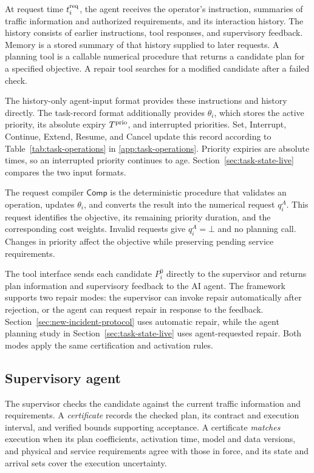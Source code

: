 \documentclass[preprint,12pt]{elsarticle}
\theoremstyle{definition}
\theoremstyle{plain}
\theoremstyle{definition}
\theoremstyle{plain}
\newcommand{\appref}[1]{\ref{#1}}
\begin{document}
At request time $t_i^{\rm req}$, the agent receives the operator's
instruction, summaries of traffic information and authorized requirements,
and its interaction history. The history consists of earlier instructions,
tool responses, and supervisory feedback. Memory is a stored summary of
that history supplied to later requests. A planning tool is a callable
numerical procedure that returns a candidate plan for a specified
objective. A repair tool searches for a modified candidate after a failed
check.

The history-only agent-input format provides these instructions and
history directly. The task-record format additionally provides
$\theta_i$, which stores the active priority, its absolute expiry
$T^{\rm prio}$, and interrupted priorities. Set, Interrupt, Continue,
Extend, Resume, and Cancel update this record according to
Table~\ref{tab:task-operations} in \appref{app:task-operations}.
Priority expiries are absolute times, so an interrupted priority continues
to age. Section~\ref{sec:task-state-live} compares the two input formats.

The request compiler $\mathsf{Comp}$ is the deterministic procedure that
validates an operation, updates $\theta_i$, and converts the result into
the numerical request $q_i^A$. This request identifies the objective,
its remaining priority duration, and the corresponding cost weights.
Invalid requests give $q_i^A=\bot$ and no planning call. Changes in
priority affect the objective while preserving pending service requirements.

The tool interface sends each candidate $P_i^0$ directly to the supervisor
and returns plan information and supervisory feedback to the AI agent.
The framework supports two repair modes: the supervisor can invoke repair
automatically after rejection, or the agent can request repair in response
to the feedback. Section~\ref{sec:new-incident-protocol} uses automatic
repair, while the agent planning study in
Section~\ref{sec:task-state-live} uses agent-requested repair. Both modes
apply the same certification and activation rules.

\subsection{Supervisory agent}
\label{sec:supervisory-agent}

The supervisor checks the candidate against the current traffic
information and requirements. A \emph{certificate} records the checked
plan, its contract and execution interval, and verified bounds supporting
acceptance. A certificate \emph{matches} execution when its plan
coefficients, activation time, model and data versions, and physical and
service requirements agree with those in force, and its state and arrival
sets cover the execution uncertainty.
\end{document}
